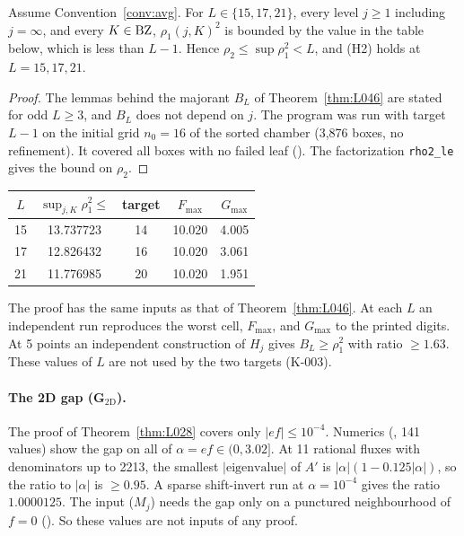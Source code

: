 \begin{proposition}[(H2) at $L=15,17,21$]\label{prop:H2other}
Assume Convention~\ref{conv:avg}. For $L\in\{15,17,21\}$, every level $j\ge1$ including $j=\infty$, and every $K\in\mathrm{BZ}$, $\rho_1(j,K)^2$ is bounded by the value in the table below, which is less than $L-1$. Hence $\rho_2\le\sup\rho_1^2<L$, and (H2) holds at $L=15,17,21$.
\end{proposition}
\begin{proof}
The lemmas behind the majorant $B_L$ of Theorem~\ref{thm:L046} are stated for odd $L\ge3$, and $B_L$ does not depend on $j$. The program  was run with target $L-1$ on the initial grid $n_0=16$ of the sorted chamber (3{,}876 boxes, no refinement). It covered all boxes with no failed leaf (). The factorization \texttt{rho2\_le} gives the bound on $\rho_2$.
\end{proof}
\begin{longtable}{|c|c|c|c|c|}
\hline
$L$ & $\sup_{j,K}\rho_1^2\le$ & target & $F_{\max}$ & $G_{\max}$ \\ \hline
15 & 13.737723 & 14 & 10.020 & 4.005 \\ \hline
17 & 12.826432 & 16 & 10.020 & 3.061 \\ \hline
21 & 11.776985 & 20 & 10.020 & 1.951 \\ \hline
\end{longtable}
The proof has the same inputs as that of Theorem~\ref{thm:L046}. At each $L$ an independent run reproduces the worst cell, $F_{\max}$, and $G_{\max}$ to the printed digits. At 5 points an independent construction of $H_j$ gives $B_L\ge\rho_1^2$ with ratio $\ge1.63$. These values of $L$ are not used by the two targets (K-003).

\paragraph{The 2D gap (G$_{\mathrm{2D}}$).} The proof of Theorem~\ref{thm:L028} covers only $|ef|\le10^{-4}$. Numerics (, 141 values) show the gap on all of $\alpha=ef\in(0,3.02]$. At 11 rational fluxes with denominators up to 2213, the smallest $|\text{eigenvalue}|$ of $A'$ is $|\alpha|(1-0.125|\alpha|)$, so the ratio to $|\alpha|$ is $\ge0.95$. A sparse shift-invert run at $\alpha=10^{-4}$ gives the ratio $1.0000125$. The input ($M_j$) needs the gap only on a punctured neighbourhood of $f=0$ (). So these values are not inputs of any proof.

